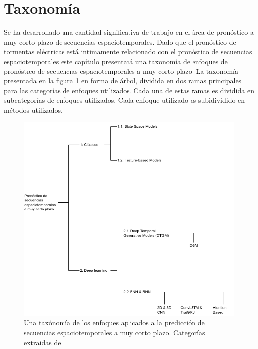 \section{Taxonomía}

Se ha desarrollado una cantidad significativa de trabajo en el área de 
pronóstico a muy corto plazo de secuencias espaciotemporales. Dado que 
el pronóstico de tormentas eléctricas está intimamente relacionado con el 
pronóstico de secuencias espaciotemporales este capítulo presentará una 
taxonomía de enfoques de pronóstico de secuencias espaciotemporales a muy 
corto plazo.\newline
La taxonomía presentada en la figura \ref{fig:taxonomia} en forma de árbol, 
dividida en dos ramas principales para las categorías de enfoques utilizados. 
Cada una de estas ramas es dividida en subcategorías de enfoques utilizados. 
Cada enfoque utilizado es subidividido en métodos utilizados.

\begin{figure}[H]
  \centering
  \includegraphics[width=14cm]{./E_IMAGENES/3_EstadoArte/taxonomia}
  \caption[Taxónomía de enfoques de estado del arte]{
    Una taxónomía de los enfoques aplicados a la predicción de secuencias 
    espaciotemporales a muy corto plazo. Categorías extraidas de 
    \cite{DBLP:journals/corr/abs-1808-06865}.
  }
  \label{fig:taxonomia}
\end{figure}

